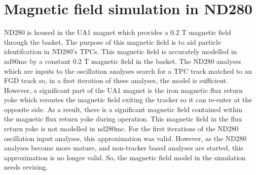 


\chapter{Magnetic field simulation in ND280}
\label{chap:MagneticFieldSimulation}
ND280 is housed in the UA1 magnet which provides a 0.2 T magnetic field through the basket.  The purpose of this magnetic field is to aid particle identifcation in ND280's TPCs.  This magnetic field is accurately modelled in nd80mc by a constant 0.2 T magnetic field in the basket.  The ND280 analyses which are inputs to the oscillation analyses search for a TPC track matched to an FGD track so, in a first iteration of these analyses, the model is sufficient.
\newline
\newline
However, a significant part of the UA1 magnet is the iron magnetic flux return yoke which reroutes the magnetic field exiting the tracker so it can re-enter at the opposite side.  As a result, there is a significant magnetic field contained within the magnetic flux return yoke during operation.  This magnetic field in the flux return yoke is not modelled in nd280mc.  For the first iterations of the ND280 oscillation input analyses, this approximation was valid.  However, as the ND280 analyses become more mature, and non-tracker based analyses are started, this approximation is no longer valid.  So, the magnetic field model in the simulation needs revising. 

